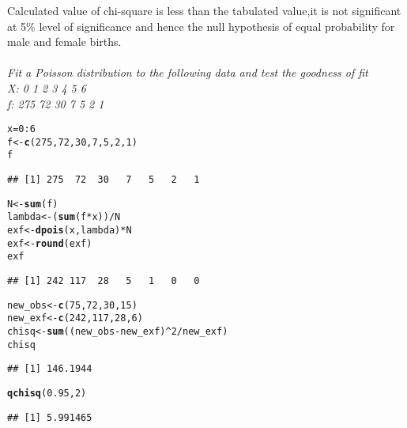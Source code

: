 \documentclass{article}\usepackage[]{graphicx}\usepackage[]{xcolor}
\makeatletter
\newcommand{\hlnum}[1]{\textcolor[rgb]{0.686,0.059,0.569}{#1}}%
\newcommand{\hlopt}[1]{\textcolor[rgb]{0,0,0}{#1}}%
\newcommand{\hldef}[1]{\textcolor[rgb]{0.345,0.345,0.345}{#1}}%
\newcommand{\hlkwb}[1]{\textcolor[rgb]{0.69,0.353,0.396}{#1}}%
\newcommand{\hlkwd}[1]{\textcolor[rgb]{0.737,0.353,0.396}{\textbf{#1}}}%
\newenvironment{kframe}{%
 \def\at@end@of@kframe{}%
 \ifinner\ifhmode%
  \def\at@end@of@kframe{\end{minipage}}%
  \begin{minipage}{\columnwidth}%
 \fi\fi%
 \def\FrameCommand##1{\hskip\@totalleftmargin \hskip-\fboxsep
 \colorbox{shadecolor}{##1}\hskip-\fboxsep
     \hskip-\linewidth \hskip-\@totalleftmargin \hskip\columnwidth}%
 \MakeFramed {\advance\hsize-\width
   \@totalleftmargin\z@ \linewidth\hsize
   \@setminipage}}%
 {\par\unskip\endMakeFramed%
 \at@end@of@kframe}
\newenvironment{knitrout}{}{} %
\makeatother
\begin{document}
Calculated value of chi-square is less than the tabulated value,it is not significant at 5\% level of significance and hence the null hypothesis of equal probability for male and female births.
\\
\\
\emph{
Fit a Poisson distribution to the following data and test the goodness of fit\\
X: 0 1
2 3 4 5 6\\
f: 275 72 30 7 5 2 1}
\begin{knitrout}
\color{fgcolor}\begin{kframe}
\begin{alltt}
\hldef{x} \hlkwb{=} \hlnum{0}\hlopt{:}\hlnum{6}
\hldef{f} \hlkwb{<-} \hlkwd{c}\hldef{(}\hlnum{275}\hldef{,} \hlnum{72}\hldef{,} \hlnum{30}\hldef{,} \hlnum{7}\hldef{,} \hlnum{5}\hldef{,} \hlnum{2}\hldef{,} \hlnum{1}\hldef{)}
\hldef{f}
\end{alltt}
\begin{verbatim}
## [1] 275  72  30   7   5   2   1
\end{verbatim}
\begin{alltt}
\hldef{N} \hlkwb{<-} \hlkwd{sum}\hldef{(f)}
\hldef{lambda} \hlkwb{<-} \hldef{(}\hlkwd{sum}\hldef{(f}\hlopt{*}\hldef{x))}\hlopt{/}\hldef{N}
\hldef{exf} \hlkwb{<-} \hlkwd{dpois}\hldef{(x, lambda)}\hlopt{*}\hldef{N}
\hldef{exf} \hlkwb{<-} \hlkwd{round}\hldef{(exf)}
\hldef{exf}
\end{alltt}
\begin{verbatim}
## [1] 242 117  28   5   1   0   0
\end{verbatim}
\begin{alltt}
\hldef{new_obs} \hlkwb{<-} \hlkwd{c}\hldef{(}\hlnum{75}\hldef{,} \hlnum{72}\hldef{,} \hlnum{30}\hldef{,} \hlnum{15}\hldef{)}
\hldef{new_exf} \hlkwb{<-} \hlkwd{c}\hldef{(}\hlnum{242}\hldef{,} \hlnum{117}\hldef{,} \hlnum{28}\hldef{,} \hlnum{6}\hldef{)}
\hldef{chisq} \hlkwb{<-}  \hlkwd{sum}\hldef{((new_obs}\hlopt{-}\hldef{new_exf)}\hlopt{^}\hlnum{2}\hlopt{/}\hldef{new_exf)}
\hldef{chisq}
\end{alltt}
\begin{verbatim}
## [1] 146.1944
\end{verbatim}
\begin{alltt}
\hlkwd{qchisq}\hldef{(}\hlnum{0.95}\hldef{,} \hlnum{2}\hldef{)}
\end{alltt}
\begin{verbatim}
## [1] 5.991465
\end{verbatim}
\end{kframe}
\end{knitrout}
\end{document}
